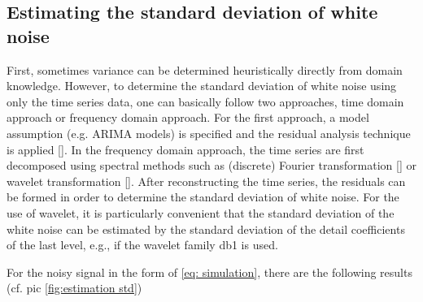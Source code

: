 \documentclass[oneside]{article}
\theoremstyle{plain}%
\theoremstyle{definition}
\begin{document}
\subsection{Estimating the standard deviation of white noise}

First, sometimes variance can be determined heuristically directly from domain knowledge. 
However, to determine the standard deviation of white noise using only the time series data, one can basically follow two approaches, time domain approach or frequency domain approach. For the first approach, a model assumption (e.g. ARIMA models) is specified and the residual analysis technique is applied [\cite{chitturi1974distribution}]. 
In the frequency domain approach, the time series are first decomposed using spectral methods such as (discrete) Fourier transformation [\cite{sauer1992noise}] or wavelet transformation [\cite{heil1989continuous,donoho1994ideal,jansen2012noise}]. After reconstructing the time series, the residuals can be formed in order to determine the standard deviation of white noise. For the use of wavelet, it is particularly convenient that the standard deviation of the white noise can be estimated by the standard deviation of the detail coefficients of the last level, e.g., if the wavelet family db1 is used.

For the noisy signal in the form of \ref{eq: simulation},  there are the following results (cf. pic \ref{fig:estimation std})



\end{document}
